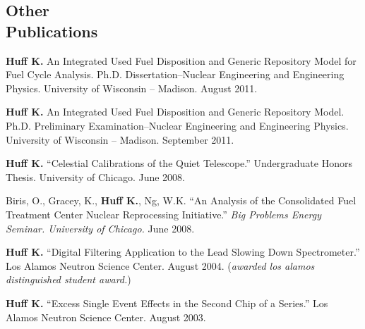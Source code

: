 \documentclass[margin,line]{resume}
\begin{document}
\begin{resume}
    \section{\mysidestyle Other\\Publications}
    \begin{bibenum}
      \item \textbf{Huff K.} An Integrated Used Fuel Disposition and Generic Repository Model for Fuel Cycle Analysis. 
        Ph.D. Dissertation--Nuclear Engineering and Engineering 
        Physics. University of Wisconsin -- Madison.  August 2011. 
      \item \textbf{Huff K.} An Integrated Used Fuel Disposition and Generic Repository Model. 
        Ph.D. Preliminary Examination--Nuclear Engineering and Engineering 
        Physics. University of Wisconsin -- Madison.  September 2011. 
      \item \textbf{Huff K.} ``Celestial Calibrations of the Quiet Telescope.''
        Undergraduate Honors Thesis. University of Chicago. June 2008.
      \item Biris, O., Gracey, K., \textbf{Huff K.}, Ng, W.K.  
        ``An Analysis of the Consolidated Fuel Treatment Center Nuclear 
        Reprocessing Initiative.''
        \emph{Big Problems Energy Seminar. University of Chicago.} June 2008.
      \item \textbf{Huff K.} ``Digital Filtering Application to the Lead Slowing Down 
        Spectrometer.'' Los Alamos Neutron Science Center. August 2004.  %
        (\emph{awarded los alamos distinguished student award.}) 
      \item \textbf{Huff K.} ``Excess Single Event Effects in the Second Chip of a Series.'' 
        Los Alamos Neutron Science Center. August 2003. 
    \end{bibenum}

    \vspace{5mm}

\end{resume}
\end{document}
